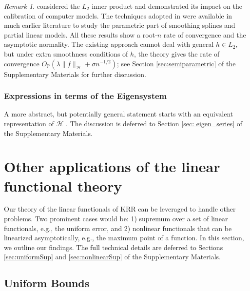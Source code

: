 \documentclass[12pt]{article}
\theoremstyle{plain}
\theoremstyle{remark}
\newtheorem{remark}{Remark}
\begin{document}
\begin{remark}
    \cite{tuo2015efficient} considered the $L_2$ inner product and demonstrated its impact on the calibration of computer models. The techniques adopted in \cite{tuo2015efficient} were available in much earlier literature to study the parametric part of smoothing splines and partial linear models. All these results show a root-$n$ rate of convergence and the asymptotic normality. The existing approach cannot deal with general $h\in L_2$, but under extra smoothness conditions of $h$, the theory gives the rate of convergence $O_\mathbb{P}(\lambda\|f\|_\mathcal{H}+\sigma n^{-1/2})$; see Section \ref{sec:semiparametric} of the Supplementary Materials for further discussion.
\end{remark}


\subsubsection{Expressions in terms of the Eigensystem}\label{sec:series}

A more abstract, but potentially general statement starts with an equivalent representation of $\mathcal{H}$ \citep{wendland2004scattered}. The discussion is deferred to Section \ref{sec: eigen_series} of the Supplementary Materials.

\section{Other applications of the linear functional theory}\label{sec:other}

Our theory of the linear functionals of KRR can be leveraged to handle other problems. Two prominent cases would be: 1) supremum over a set of linear functionals, e.g., the uniform error, and 2) nonlinear functionals that can be linearized asymptotically, e.g., the maximum point of a function. In this section, we outline our findings. The full technical details are deferred to Sections \ref{sec:uniformSup} and \ref{sec:nonlinearSup} of the Supplementary Materials.



\subsection{Uniform Bounds}\label{sec:uniform}
\end{document}
